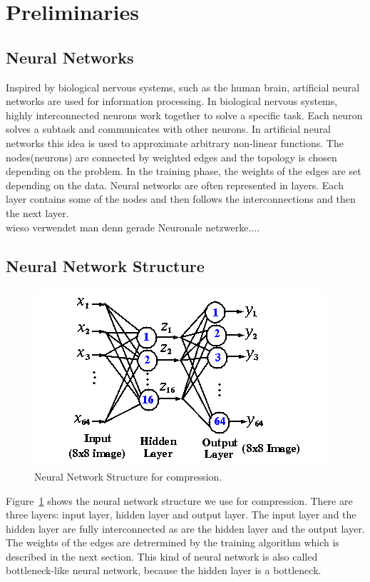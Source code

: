 \section{Preliminaries}
\label{sec:preliminaries}

\subsection{Neural Networks}
Inspired by biological nervous systems, such as the human brain, artificial neural networks are used for information processing. In biological nervous systems, highly interconnected neurons work together to solve a specific task. Each neuron solves a subtask and communicates with other neurons. In artificial neural networks this idea is used to approximate arbitrary  non-linear functions. The nodes(neurons) are connected by weighted edges and the topology is chosen depending on the problem. In the training phase, the weights of the edges are set depending on the data. Neural networks are often represented in layers. Each layer contains some of the nodes and then follows the interconnections and then the next layer. 
\\
wieso verwendet man denn gerade Neuronale netzwerke....
\subsection{Neural Network Structure}
\label{sec:neural_net_structure}
\begin{figure}[tbp]
  \centering
  \includegraphics[width=\columnwidth]{nnStructure}
  \caption{Neural Network Structure for compression.}
  \label{fig:nnStructure}
\end{figure}

Figure~\ref{fig:nnStructure} shows the neural network structure we use for compression. There are three layers: input layer, hidden layer and output layer. The input layer and the hidden layer are fully interconnected as are the hidden layer and the output layer. The weights of the edges are detrermined by the training algorithm which is described in the next section. This kind of neural network is also called bottleneck-like neural network, because the hidden layer is a bottleneck.

